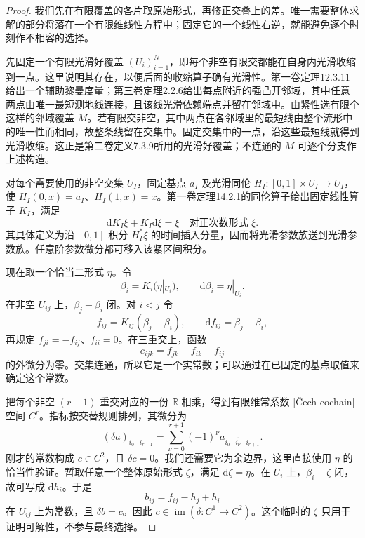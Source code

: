 \begin{proof}
	我们先在有限覆盖的各片取原始形式，再修正交叠上的差。唯一需要整体求解的部分将落在一个有限维线性方程中；固定它的一个线性右逆，就能避免逐个时刻作不相容的选择。

	先固定一个有限光滑好覆盖 \((U_i)_{i=1}^N\)，即每个非空有限交都能在自身内光滑收缩到一点。这里说明其存在，以便后面的收缩算子确有光滑性。第一卷定理12.3.11给出一个辅助黎曼度量；第三卷定理2.2.6给出每点附近的强凸开邻域，其中任意两点由唯一最短测地线连接，且该线光滑依赖端点并留在邻域中。由紧性选有限个这样的邻域覆盖 \(M\)。若有限交非空，其中两点在各邻域里的最短线由整个流形中的唯一性而相同，故整条线留在交集中。固定交集中的一点，沿这些最短线就得到光滑收缩。这正是第二卷定义7.3.9所用的光滑好覆盖；不连通的 \(M\) 可逐个分支作上述构造。

	对每个需要使用的非空交集 \(U_I\)，固定基点 \(a_I\) 及光滑同伦 \(H_I:[0,1]\times U_I\to U_I\)，使 \(H_I(0,x)=a_I\)、\(H_I(1,x)=x\)。第一卷定理14.2.1的同伦算子给出固定线性算子 \(K_I\)，满足
	\[
		\mathrm{d}K_I\xi+K_I\mathrm{d}\xi=\xi
		\quad\text{对正次数形式 }\xi.
	\]
	其具体定义为沿 \([0,1]\) 积分 \(H_I^*\xi\) 的时间插入分量，因而将光滑参数族送到光滑参数族。任意阶参数微分都可移入该紧区间积分。

	现在取一个恰当二形式 \(\eta\)。令
	\[
		\beta_i=K_i(\eta|_{U_i}),\qquad \mathrm{d}\beta_i=\eta|_{U_i}.
	\]
	在非空 \(U_{ij}\) 上，\(\beta_j-\beta_i\) 闭。对 \(i<j\) 令
	\[
		f_{ij}=K_{ij}(\beta_j-\beta_i),\qquad
		\mathrm{d}f_{ij}=\beta_j-\beta_i,
	\]
	再规定 \(f_{ji}=-f_{ij}\)、\(f_{ii}=0\)。在三重交上，函数
	\[
		c_{ijk}=f_{jk}-f_{ik}+f_{ij}
	\]
	的外微分为零。交集连通，所以它是一个实常数；可以通过在已固定的基点取值来确定这个常数。

	把每个非空 \((r+1)\) 重交对应的一份 \(\mathbb R\) 相乘，得到有限维常系数 [Čech cochain]空间 \(C^r\)。指标按交替规则排列，其微分为
	\[
		(\delta a)_{i_0\cdots i_{r+1}}
		=\sum_{\nu=0}^{r+1}(-1)^\nu
		a_{i_0\cdots\widehat{i_\nu}\cdots i_{r+1}}.
	\]
	刚才的常数构成 \(c\in C^2\)，且 \(\delta c=0\)。我们还需要它为余边界，这里直接使用 \(\eta\) 的恰当性验证。暂取任意一个整体原始形式 \(\zeta\)，满足 \(\mathrm{d}\zeta=\eta\)。在 \(U_i\) 上，\(\beta_i-\zeta\) 闭，故可写成 \(\mathrm{d}h_i\)。于是
	\[
		b_{ij}=f_{ij}-h_j+h_i
	\]
	在 \(U_{ij}\) 上为常数，且 \(\delta b=c\)。因此 \(c\in\operatorname{im}(\delta:C^1\to C^2)\)。这个临时的 \(\zeta\) 只用于证明可解性，不参与最终选择。


\end{proof}
